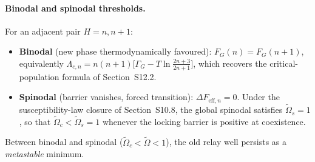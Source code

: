 \documentclass[11pt]{article}
\begin{document}
\paragraph{Binodal and spinodal thresholds.}
For an adjacent pair $H = n, n{+}1$:

\begin{itemize}
\item \textbf{Binodal} (new phase thermodynamically favoured):
$F_G(n) = F_G(n{+}1)$, equivalently
$\Lambda_{c,n} = n(n{+}1)\bigl[\Gamma_G - T\ln\frac{2n+3}{2n+1}\bigr]$,
which recovers the critical-population formula of Section~S12.2.

\item \textbf{Spinodal} (barrier vanishes, forced transition):
$\Delta F_{\mathrm{eff},n} = 0$.
Under the susceptibility-law closure of Section~S10.8,
the global spinodal satisfies $\tilde\Omega_s = 1$, so that
$\tilde\Omega_c < \tilde\Omega_s = 1$
whenever the locking barrier is positive at coexistence.
\end{itemize}

Between binodal and spinodal ($\tilde\Omega_c < \tilde\Omega < 1$),
the old relay well persists as a \emph{metastable} minimum.
\end{document}
